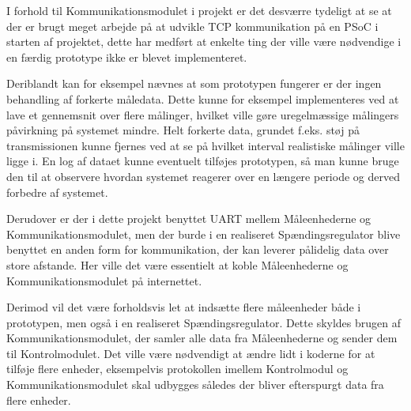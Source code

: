 
I forhold til Kommunikationsmodulet i projekt er det desværre tydeligt at se at der er brugt meget arbejde på at udvikle TCP kommunikation på en PSoC i starten af projektet, dette har medført at enkelte ting der ville være nødvendige i en færdig prototype ikke er blevet implementeret.

Deriblandt kan for eksempel nævnes at som prototypen fungerer er der ingen behandling af forkerte måledata. Dette kunne for eksempel implementeres ved at lave et gennemsnit over flere målinger, hvilket ville gøre uregelmæssige målingers påvirkning på systemet mindre. Helt forkerte data, grundet f.eks. støj på transmissionen kunne fjernes ved at se på hvilket interval realistiske målinger ville ligge i. En log af dataet kunne eventuelt tilføjes prototypen, så man kunne bruge den til at observere hvordan systemet reagerer over en længere periode og derved forbedre af systemet.

Derudover er der i dette projekt benyttet UART mellem Måleenhederne og Kommunikationsmodulet, men der burde i en realiseret Spændingsregulator blive benyttet en anden form for kommunikation, der kan leverer pålidelig data over store afstande. Her ville det være essentielt at koble Måleenhederne og Kommunikationsmodulet på internettet.

Derimod vil det være forholdsvis let at indsætte flere måleenheder både i prototypen, men også i en realiseret Spændingsregulator. Dette skyldes brugen af Kommunikationsmodulet, der samler alle data fra Måleenhederne og sender dem til Kontrolmodulet. Det ville være nødvendigt at ændre lidt i koderne for at tilføje flere enheder, eksempelvis protokollen imellem Kontrolmodul og Kommunikationsmodulet skal udbygges således der bliver efterspurgt data fra flere enheder.


